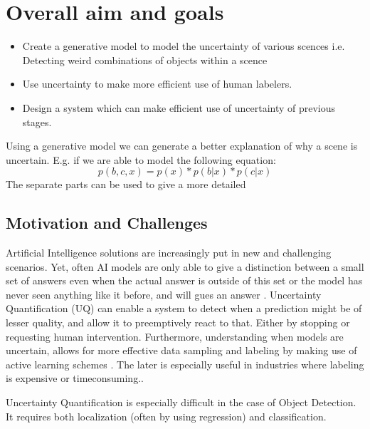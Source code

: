 \section{Overall aim and goals}\label{sec:goals}
\begin{itemize}
    \item Create a generative model to model the uncertainty of various scences
          \subitem i.e. Detecting weird combinations of objects within a scence
    \item Use uncertainty to make more efficient use of human labelers.
    \item Design a system which can make efficient use of uncertainty of previous stages.
\end{itemize}

Using a generative model we can generate a better explanation of why a scene is uncertain. E.g. if we are able to model the following equation:
\begin{equation}
    p(b, c, x) = p(x) * p(b | x) * p(c | x)
\end{equation}
The separate parts can be used to give a more detailed

\subsection{Motivation and Challenges}

Artificial Intelligence solutions are increasingly put in new and challenging scenarios. Yet, often AI models are only able to give a distinction between a small set of answers even when the actual answer is outside of this set  or the model has never seen anything like it before, and will gues an answer . Uncertainty Quantification (UQ) can enable a system to detect when a prediction might be of lesser quality, and allow it to preemptively react to that. Either by stopping or requesting human intervention. Furthermore, understanding when models are uncertain, allows for more effective data sampling and labeling by making use of active learning schemes . The later is especially useful in industries where labeling is expensive or timeconsuming..

Uncertainty Quantification is especially difficult in the case of Object Detection. It requires both localization (often by using regression) and classification.

